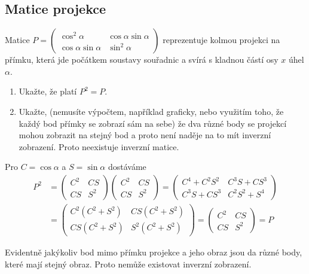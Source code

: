 \subsection{Matice projekce}
Matice $P=
\begin{pmatrix}
  \cos^2 \alpha & \cos \alpha \sin \alpha \\
  \cos\alpha\sin\alpha & \sin^2 \alpha
\end{pmatrix}
$ reprezentuje kolmou projekci na přímku, která jde počátkem soustavy souřadnic a svírá s kladnou částí osy $x$ úhel $\alpha$.
\begin{enumerate}
\item Ukažte, že platí $P^2=P$.
\item Ukažte, (nemusíte výpočtem, například graficky, nebo využitím
  toho, že každý bod přímky se zobrazí sám na sebe) že dva různé body
  se projekcí mohou zobrazit na stejný bod a proto není naděje na to
  mít inverzní zobrazení. Proto neexistuje inverzní matice.
\end{enumerate}

\reseni
Pro $C=\cos \alpha$ a $S=\sin\alpha$ dostáváme
\begin{equation*}
  \begin{aligned}
P^2&=
  \begin{pmatrix}
    C^2 & CS \\CS & S^2
  \end{pmatrix}
  \begin{pmatrix}
    C^2 & CS \\CS & S^2
  \end{pmatrix}
=
\begin{pmatrix}
  C^4+C^2S^2 & C^3S+CS^3 \\
C^3S+CS^3 & C^2S^2+S^4
\end{pmatrix}
\\&=
\begin{pmatrix}
  C^2(C^2+S^2) & CS(C^2+S^2) \\
CS(C^2+S^2) & S^2(C^2+S^2)
\end{pmatrix}
=
\begin{pmatrix}
  C^2 & CS \\
CS & S^2
\end{pmatrix}
=P
\end{aligned}
\end{equation*}

Evidentně jakýkoliv bod mimo přímku projekce a jeho obraz jsou da různé body, které mají stejný obraz. Proto nemůže existovat inverzní zobrazení.

